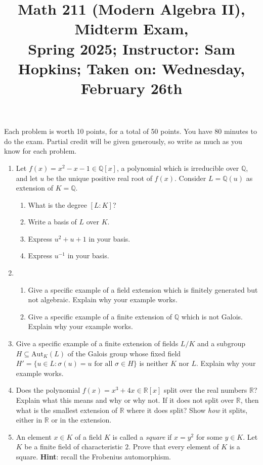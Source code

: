 \documentclass[11pt]{article}
\title{Math 211 (Modern Algebra II), Midterm Exam, \\ {\normalsize Spring 2025; Instructor: Sam Hopkins; Taken on: Wednesday, February 26th}}
\date{}
\begin{document}
\maketitle

Each problem is worth 10 points, for a total of 50 points. You have 80 minutes to do the exam. Partial credit will be given generously, so write as much as you know for each problem.

\thispagestyle{empty}
\begin{enumerate}

\item Let $f(x) = x^2 - x - 1 \in \mathbb{Q}[x]$, a polynomial which is irreducible over $\mathbb{Q}$, and let $u$ be the unique positive real root of $f(x)$. Consider $L=\mathbb{Q}(u)$ as extension of $K=\mathbb{Q}$.
\begin{enumerate}
\item What is the degree $[L:K]$? 
\item Write a basis of $L$ over $K$.
\item Express $u^2+u+1$ in your basis.
\item Express $u^{-1}$ in your basis.
\end{enumerate}

\item \begin{enumerate}
\item Give a specific example of a field extension which is finitely generated but not algebraic. Explain why your example works.
\item Give a specific example of a finite extension of $\mathbb{Q}$ which is not Galois. Explain why your example works.
\end{enumerate}

\item Give a specific example of a finite extension of fields $L/K$ and a subgroup $H \subseteq \mathrm{Aut}_{K}(L)$ of the Galois group whose fixed field $H' = \{u \in L\colon \sigma(u) = u \textrm{ for all } \sigma \in H\}$ is neither $K$ nor $L$. Explain why your example works.

\item Does the polynomial $f(x) = x^3+4x \in \mathbb{R}[x]$ split over the real numbers $\mathbb{R}$? Explain what this means and why or why not. If it does not split over $\mathbb{R}$, then what is the smallest extension of $\mathbb{R}$ where it does split? Show \emph{how} it splits, either in $\mathbb{R}$ or in the extension.

\item An element $x\in K$ of a field $K$ is called a \emph{square} if $x=y^2$ for some $y\in K$. Let $K$ be a finite field of characteristic $2$. Prove that every element of $K$ is a square. {\bf Hint}: recall the Frobenius automorphism.

\end{enumerate}
\end{document}
